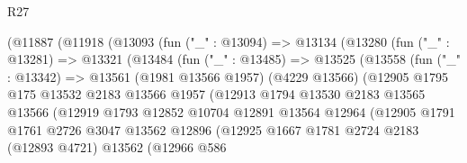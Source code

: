 \begin{lexlean}{R27}
\begin{coremodule}
                    (@11887
                      (@11918
                        (@13093
                          (fun ("_" : @13094) =>
                          @13134
                            (@13280
                              (fun ("_" : @13281) =>
                              @13321
                                (@13484
                                  (fun ("_" : @13485) =>
                                  @13525
                                    (@13558
                                      (fun ("_" : @13342) =>
                                      @13561
                                        (@1981 @13566 @1957)
                                        (@4229 @13566)
                                        (@12905
                                          @1795
                                          @175
                                          @13532
                                          @2183
                                          @13566
                                          @1957
                                          (@12913
                                            @1794
                                            @13530
                                            @2183
                                            @13565
                                            @13566
                                            (@12919
                                              @1793
                                              @12852
                                              @10704
                                              @12891
                                              @13564
                                              @12964
                                              (@12905
                                                @1791
                                                @1761
                                                @2726
                                                @3047
                                                @13562
                                                @12896
                                                (@12925
                                                  @1667
                                                  @1781
                                                  @2724
                                                  @2183
                                                  (@12893 @4721)
                                                  @13562
                                                  (@12966
                                                    @586

\end{coremodule}
\end{lexlean}

